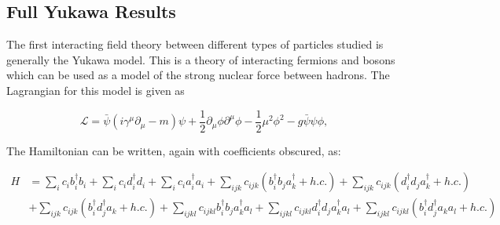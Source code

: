 \subsection{Full Yukawa Results}
\label{sec:yukawa_results}

The first interacting field theory between different types of particles studied is generally the Yukawa model.
This is a theory of interacting fermions and bosons which can be used as a model of the strong nuclear force between hadrons.
The Lagrangian for this model is given as

\begin{equation}
    \label{eq:yukawa-lagrangian}
    \mathcal{L} = \bar \psi \left(i\gamma^\mu \partial_\mu - m \right)\psi + \frac{1}{2}\partial_\mu \phi \partial^\mu \phi - \frac{1}{2}\mu^2\phi^2 - g\bar \psi \psi \phi,
\end{equation}

The Hamiltonian can be written, again with coefficients obscured, as:

\begin{align}
    H &= \sum_i c_i b_i^\dagger b_i + \sum_i c_i d_i^\dagger d_i + \sum_i c_i a_i^\dagger a_i + \sum_{ijk}c_{ijk}\left(b_i^\dagger b_j a_k^\dagger + h.c. \right) + \sum_{ijk}c_{ijk}\left(d_i^\dagger d_j a_k^\dagger + h.c. \right) \\
    &+\sum_{ijk}c_{ijk}\left(b_i^\dagger d_j^\dagger a_k + h.c. \right) + \sum_{ijkl}c_{ijkl}b_i^\dagger b_j a_k^\dagger a_l + \sum_{ijkl}c_{ijkl}d_i^\dagger d_j a_k^\dagger a_l + \sum_{ijkl}c_{ijkl}\left(b_i^\dagger d_j^\dagger a_k a_l + h.c. \right)
\end{align}

